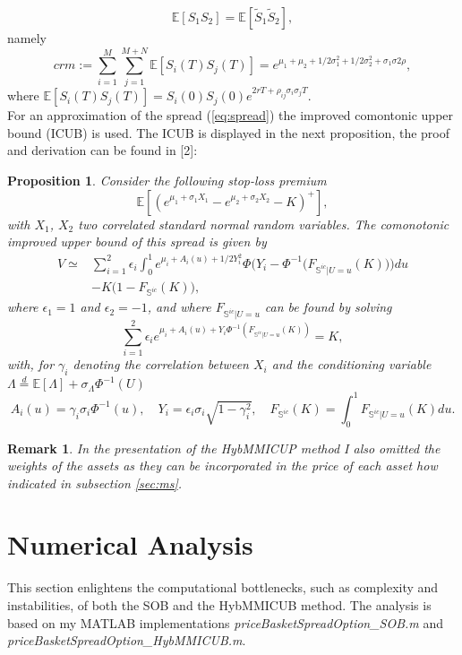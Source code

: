 \documentclass[a4paper]{article}
\newtheorem{prop}{Proposition}
\newtheorem*{remark}{Remark}
\begin{document}
$$\mathbb{E}[S_1S_2] = \mathbb{E}[\tilde{S}_1\tilde{S}_2],$$
namely
\begin{equation}
crm:=\sum_{i=1}^{M}\sum_{j=1}^{M+N}\mathbb{E}[S_i(T)S_j(T)]=e^{\mu_1+\mu_2+1/2\sigma_1^2+1/2\sigma_2^2+\sigma_1\sigma2\rho},
\end{equation}
where $\mathbb{E}[S_i(T)S_j(T)] = S_i(0) S_j(0) e^{2rT+\rho_{ij}\sigma_i\sigma_jT}.$\\
For an approximation of the spread (\ref{eq:spread}) the improved comontonic upper bound (ICUB) is used. The ICUB is displayed in the next proposition, the proof and derivation can be found in [2]:
\begin{prop}
Consider the following stop-loss premium
$$\mathbb{E}[(e^{\mu_1+\sigma_1X_1}-e^{\mu_2+\sigma_2X_2}-K)^+],$$
with $X_1$, $X_2$ two correlated standard normal random variables. The comonotonic improved upper bound of this spread is given by
\begin{equation}
\begin{split}
V \simeq &\sum_{i=1}^2\epsilon_i\int_0^1e^{\mu_i+A_i(u)+1/2Y_i^2}\Phi\big(Y_i-\Phi^{-1}\big(F_{\mathbb{S}^{ic}|U=u}(K)\big)\big)du\\
	&-K\big(1-F_{\mathbb{S}^{ic}}(K)\big),
\end{split}
\end{equation}
where $\epsilon_1=1$ and $\epsilon_2=-1$, and where $F_{\mathbb{S}^{ic}|U=u}$ can be found by solving
\begin{equation}
\sum_{i=1}^2\epsilon_ie^{\mu_i+A_i(u)+Y_i\Phi^{-1}(F_{\mathbb{S}^{ic}|U=u}(K))}=K,
\end{equation}
with, for $\gamma_i$ denoting the correlation between $X_i$ and the conditioning variable $\Lambda \stackrel{d}{=} \mathbb{E}[\Lambda]+\sigma_{\Lambda}\Phi^{-1}(U)$
$$A_i(u)=\gamma_i\sigma_i\Phi^{-1}(u),\quad Y_i=\epsilon_i\sigma_i\sqrt{1-\gamma_i^2}, \quad F_{\mathbb{S}^{ic}}(K) = \int_0^1F_{\mathbb{S}^{ic}|U=u}(K)du.$$
\end{prop}
\begin{remark}
In the presentation of the HybMMICUP method I also omitted the weights of the assets as they can be incorporated in the price of each asset how indicated in subsection \ref{sec:ms}.
\end{remark}

\newpage
\section{Numerical Analysis}
\label{sec:na}
This section enlightens the computational bottlenecks, such as complexity and instabilities, of both the SOB and the HybMMICUB method. The analysis is based on my MATLAB implementations \textit{priceBasketSpreadOption\_SOB.m} and \textit{priceBasketSpreadOption\_HybMMICUB.m}.
\end{document}
